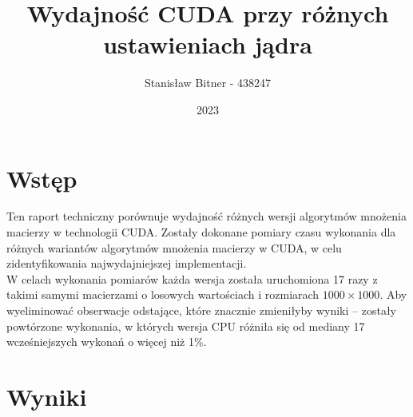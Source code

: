 \documentclass[12pt, a4paper]{article}
\title{Wydajność CUDA przy różnych ustawieniach jądra}
\author{Stanisław Bitner - 438247}
\date{2023}
\begin{document}
\maketitle

\section*{Wstęp}

Ten raport techniczny porównuje wydajność różnych wersji algorytmów mnożenia
macierzy w technologii CUDA. Zostały dokonane pomiary czasu wykonania dla
różnych wariantów algorytmów mnożenia macierzy w CUDA, w celu zidentyfikowania
najwydajniejszej implementacji.\\
W celach wykonania pomiarów każda wersja została uruchomiona 17 razy z takimi
samymi macierzami o losowych wartościach i rozmiarach $1000 \times 1000$. Aby
wyeliminować obserwacje odstające, które znacznie zmieniłyby wyniki -- zostały
powtórzone wykonania, w których wersja CPU różniła się od mediany
17 wcześniejszych wykonań o więcej niż 1\%.

\section*{Wyniki}
\end{document}

